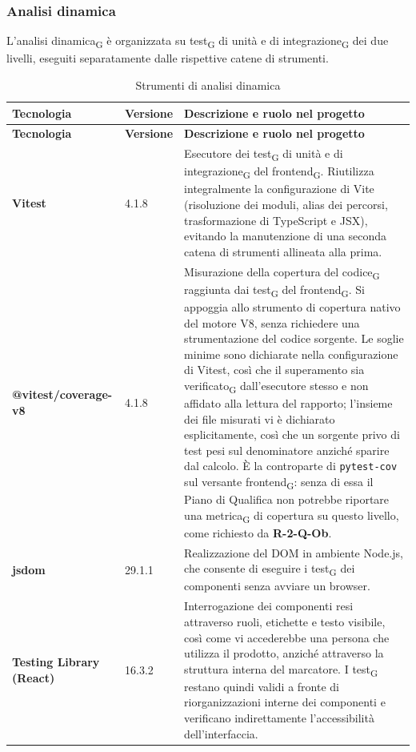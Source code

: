 \documentclass[a4paper, 10pt]{article}
\newenvironment{tabellatec}[2]{%
  \begingroup
  \small
  \setlength{\tabcolsep}{4pt}
  \begin{longtable}{|p{2.8cm}|p{1.5cm}|p{9.2cm}|}
    \caption{#1}\label{#2}\\
    \hline
    \textbf{Tecnologia} & \textbf{Versione} & \textbf{Descrizione e ruolo nel progetto} \\
    \hline
    \endfirsthead
    \hline
    \textbf{Tecnologia} & \textbf{Versione} & \textbf{Descrizione e ruolo nel progetto} \\
    \hline
    \endhead
}{%
  \end{longtable}
  \endgroup
}
\begin{document}
\subsubsection{Analisi dinamica}
\label{sec:analisi-dinamica}
L'analisi dinamica\textsubscript{G} è organizzata su test\textsubscript{G} di unità e di integrazione\textsubscript{G} dei due livelli, eseguiti separatamente dalle rispettive catene di strumenti.

\begin{tabellatec}{Strumenti di analisi dinamica}{tab:tec-dinamica}
    \textbf{Vitest} & 4.1.8 & Esecutore dei test\textsubscript{G} di unità e di integrazione\textsubscript{G} del frontend\textsubscript{G}. Riutilizza integralmente la configurazione di Vite (risoluzione dei moduli, alias dei percorsi, trasformazione di TypeScript e JSX), evitando la manutenzione di una seconda catena di strumenti allineata alla prima. \\ \hline

    \textbf{@vitest/\newline coverage-v8} & 4.1.8 & Misurazione della copertura del codice\textsubscript{G} raggiunta dai test\textsubscript{G} del frontend\textsubscript{G}. Si appoggia allo strumento di copertura nativo del motore V8, senza richiedere una strumentazione del codice sorgente. Le soglie minime sono dichiarate nella configurazione di Vitest, così che il superamento sia verificato\textsubscript{G} dall'esecutore stesso e non affidato alla lettura del rapporto; l'insieme dei file misurati vi è dichiarato esplicitamente, così che un sorgente privo di test pesi sul denominatore anziché sparire dal calcolo. È la controparte di \texttt{pytest-cov} sul versante frontend\textsubscript{G}: senza di essa il Piano di Qualifica non potrebbe riportare una metrica\textsubscript{G} di copertura su questo livello, come richiesto da \textbf{R-2-Q-Ob}. \\ \hline

    \textbf{jsdom} & 29.1.1 & Realizzazione del DOM in ambiente Node.js, che consente di eseguire i test\textsubscript{G} dei componenti senza avviare un browser. \\ \hline

    \textbf{Testing Library \newline (React)} & 16.3.2 & Interrogazione dei componenti resi attraverso ruoli, etichette e testo visibile, così come vi accederebbe una persona che utilizza il prodotto, anziché attraverso la struttura interna del marcatore. I test\textsubscript{G} restano quindi validi a fronte di riorganizzazioni interne dei componenti e verificano indirettamente l'accessibilità dell'interfaccia. \\ \hline


\end{tabellatec}
\end{document}
